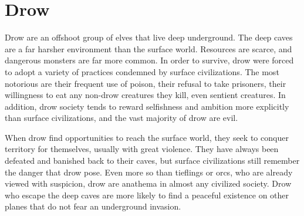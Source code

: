 \section{Drow}

  Drow are an offshoot group of elves that live deep underground.
  The deep caves are a far harsher environment than the surface world.
  Resources are scarce, and dangerous monsters are far more common.
  In order to survive, drow were forced to adopt a variety of practices condemned by surface civilizations.
  The most notorious are their frequent use of poison, their refusal to take prisoners, their willingness to eat any non-drow creatures they kill, even sentient creatures.
  In addition, drow society tends to reward selfishness and ambition more explicitly than surface civilizations, and the vast majority of drow are evil.

  When drow find opportunities to reach the surface world, they seek to conquer territory for themselves, usually with great violence.
  They have always been defeated and banished back to their caves, but surface civilizations still remember the danger that drow pose.
  Even more so than tieflings or orcs, who are already viewed with suspicion, drow are anathema in almost any civilized society.
  Drow who escape the deep caves are more likely to find a peaceful existence on other planes that do not fear an underground invasion.

